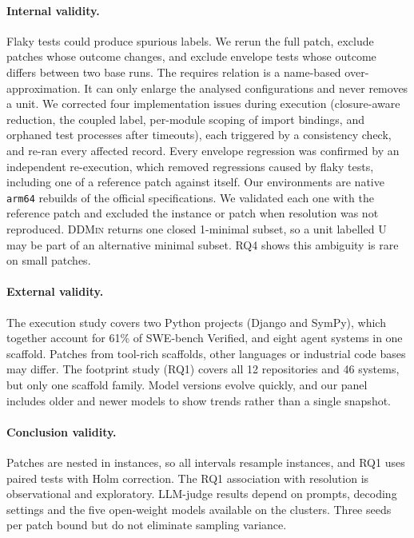 \documentclass[a4paper,fleqn]{cas-sc}
\newcommand{\lab}[1]{\textsf{#1}}
\newcommand{\rqoneSystems}{46}
\begin{document}
\paragraph{Internal validity.} Flaky tests could produce spurious labels. We rerun the full patch, exclude patches whose outcome changes, and exclude envelope tests whose outcome differs between two base runs. The requires relation is a name-based over-approximation. It can only enlarge the analysed configurations and never removes a unit. We corrected four implementation issues during execution (closure-aware reduction, the coupled label, per-module scoping of import bindings, and orphaned test processes after timeouts), each triggered by a consistency check, and re-ran every affected record. Every envelope regression was confirmed by an independent re-execution, which removed regressions caused by flaky tests, including one of a reference patch against itself. Our environments are native \texttt{arm64} rebuilds of the official specifications. We validated each one with the reference patch and excluded the instance or patch when resolution was not reproduced. \textsc{DDMin} returns one closed 1-minimal subset, so a unit labelled \lab{U} may be part of an alternative minimal subset. RQ4 shows this ambiguity is rare on small patches.

\paragraph{External validity.} The execution study covers two Python projects (Django and SymPy), which together account for 61\% of SWE-bench Verified, and eight agent systems in one scaffold. Patches from tool-rich scaffolds, other languages or industrial code bases may differ. The footprint study (RQ1) covers all 12 repositories and \rqoneSystems{} systems, but only one scaffold family. Model versions evolve quickly, and our panel includes older and newer models to show trends rather than a single snapshot.

\paragraph{Conclusion validity.} Patches are nested in instances, so all intervals resample instances, and RQ1 uses paired tests with Holm correction. The RQ1 association with resolution is observational and exploratory. LLM-judge results depend on prompts, decoding settings and the five open-weight models available on the clusters. Three seeds per patch bound but do not eliminate sampling variance.
\end{document}
